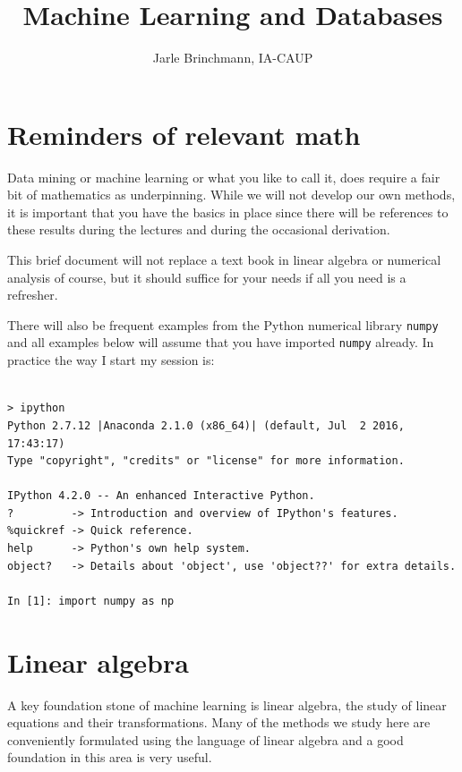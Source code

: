 \documentclass[a4paper,10pt]{article}
\begin{document}
\renewcommand{\maketitlehooka}{\sffamily\color{Mahogany}}
\title{Machine Learning and Databases}
\author{Jarle Brinchmann, IA-CAUP}
\maketitle
 
 \section{ Reminders of relevant math}

Data mining or machine learning or what you like to call it, does require a fair bit of mathematics as underpinning. While we will not develop our own methods, it is important that you have the basics in place since there will be references to these results during the lectures and during the occasional derivation.

This brief document will not replace a text book in linear algebra or numerical analysis of course, but it should suffice for your needs if all you need is a refresher.

There will also be frequent examples from the Python numerical library \texttt{numpy} and all examples below will assume that you have imported \texttt{numpy} already. In practice the way I start my session is:
\begin{lstlisting}

> ipython
Python 2.7.12 |Anaconda 2.1.0 (x86_64)| (default, Jul  2 2016, 17:43:17) 
Type "copyright", "credits" or "license" for more information.

IPython 4.2.0 -- An enhanced Interactive Python.
?         -> Introduction and overview of IPython's features.
%quickref -> Quick reference.
help      -> Python's own help system.
object?   -> Details about 'object', use 'object??' for extra details.

In [1]: import numpy as np
\end{lstlisting}

\section{ Linear algebra}

A key foundation stone of machine learning is linear algebra, the study of linear equations and their transformations. Many of the methods we study here are conveniently formulated using the language of linear algebra and a good foundation in this area is very useful.
\end{document}
